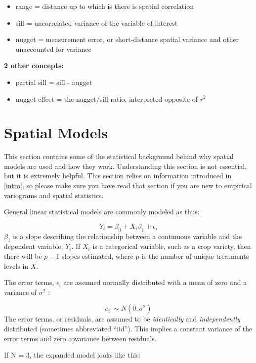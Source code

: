 \documentclass[
]{book}
\providecommand{\tightlist}{%
  \setlength{\itemsep}{0pt}\setlength{\parskip}{0pt}}
\begin{document}
\begin{itemize}
\tightlist
\item
  range = distance up to which is there is spatial correlation
\item
  sill = uncorrelated variance of the variable of interest
\item
  nugget = measurement error, or short-distance spatial variance and other unaccounted for variance
\end{itemize}

\textbf{2 other concepts:}

\begin{itemize}
\tightlist
\item
  partial sill = sill - nugget
\item
  nugget effect = the nugget/sill ratio, interpreted opposite of \(r^2\)
\end{itemize}

\hypertarget{background}{%
\chapter{Spatial Models}\label{background}}

This section contains some of the statistical background behind why spatial models are used and how they work. Understanding this section is not essential, but it is extremely helpful. This section relies on information introduced in \ref{intro}, so please make sure you have read that section if you are new to empirical variograms and spatial statistics.

General linear statistical models are commonly modeled as thus:

\[Y_i = \beta_0 + X_i\beta_1 + \epsilon_i\]
\(\beta_1\) is a slope describing the relationship between a continuous variable and the dependent variable, \(Y_i\). If \(X_i\) is a categorical variable, such as a crop variety, then there will be \(p-1\) slopes estimated, where p is the number of unique treatments levels in \(X\).

The error terms, \(\epsilon_i\) are assumed normally distributed with a mean of zero and a variance of \(\sigma^2\) :

\[e_i ~\sim N(0, \sigma^2)\]
The error terms, or residuals, are assumed to be \emph{identically} and \emph{independently} distributed (sometimes abbreviated ``iid''). This implies a constant variance of the error terms and zero covariance between residuals.

If N = 3, the expanded model looks like this:
\end{document}
